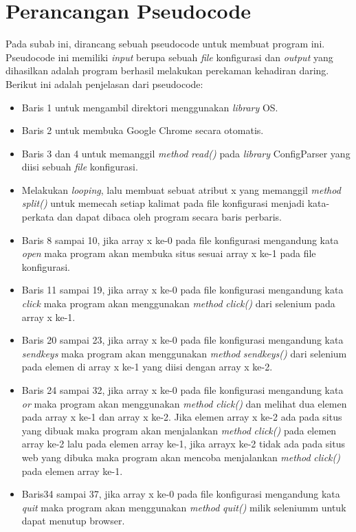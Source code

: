 \section{Perancangan Pseudocode}
Pada subab ini, dirancang sebuah pseudocode untuk membuat program ini. Pseudocode ini memiliki \textit{input} berupa sebuah \textit{file} konfigurasi dan \textit{output} yang dihasilkan adalah program berhasil melakukan perekaman kehadiran daring. Berikut ini adalah penjelasan dari pseudocode:
\begin{itemize}
	\item Baris 1 untuk mengambil direktori menggunakan \textit{library} OS.
	\item Baris 2 untuk membuka Google Chrome secara otomatis.
	\item Baris 3 dan 4 untuk memanggil \textit{method} \textit{read()} pada \textit{library} ConfigParser yang diisi sebuah \textit{file} konfigurasi. 
	\item Melakukan \textit{looping}, lalu membuat sebuat atribut x yang memanggil \textit{method} \textit{split()} untuk memecah setiap kalimat pada file konfigurasi menjadi kata-perkata dan dapat dibaca oleh program secara baris perbaris.
	\item Baris 8 sampai 10, jika array x ke-0 pada file konfigurasi mengandung kata \textit{open} maka program akan membuka situs sesuai array x ke-1 pada file konfigurasi.
	\item Baris 11 sampai 19, jika array x ke-0 pada file konfigurasi mengandung kata \textit{click} maka program akan menggunakan \textit{method} \textit{click()} dari selenium pada array x ke-1.
	\item Baris 20 sampai 23, jika array x ke-0 pada file konfigurasi mengandung kata \textit{sendkeys} maka program akan menggunakan \textit{method} \textit{sendkeys()} dari selenium pada elemen di array x ke-1 yang diisi dengan array x ke-2.
	\item Baris 24 sampai 32, jika array x ke-0 pada file konfigurasi mengandung kata \textit{or} maka program akan menggunakan \textit{method} \textit{click()} dan melihat dua elemen pada array x ke-1 dan array x ke-2. Jika elemen array x ke-2 ada pada situs yang dibuak maka program akan menjalankan \textit{method} \textit{click()} pada elemen array ke-2 lalu pada elemen array ke-1, jika arrayx ke-2 tidak ada pada situs web yang dibuka maka program akan mencoba menjalankan \textit{method} \textit{click()} pada elemen array ke-1.
	\item Baris34 sampai 37, jika array x ke-0 pada file konfigurasi mengandung kata \textit{quit} maka program akan menggunakan \textit{method} \textit{quit()} milik seleniumm untuk dapat menutup browser.
\end{itemize}
